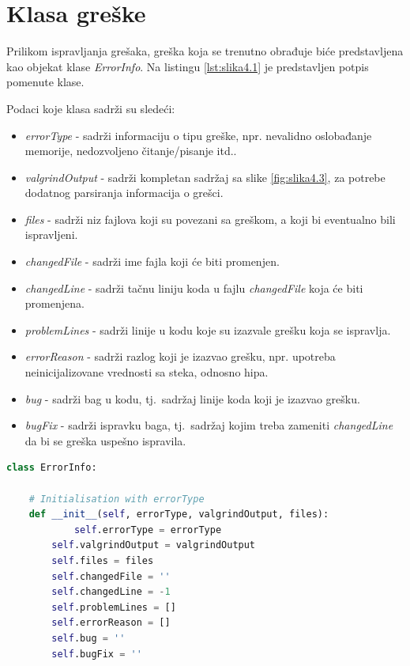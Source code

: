 \documentclass[12pt,oneside]{memoir}
\theoremstyle{plain}
\theoremstyle{definition}
\begin{document}
\section{Klasa greške}
Prilikom ispravljanja grešaka, greška koja se trenutno obrađuje biće predstavljena kao objekat klase \textit{ErrorInfo}. Na listingu \ref{lst:slika4.1} je predstavljen potpis pomenute klase.

Podaci koje klasa sadrži su sledeći:
\begin{itemize}
\item \textit{errorType} - sadrži informaciju o tipu greške, npr. nevalidno oslobađanje memorije, nedozvoljeno čitanje/pisanje itd..
\item \textit{valgrindOutput} - sadrži kompletan sadržaj sa slike \ref{fig:slika4.3}, za potrebe dodatnog parsiranja informacija o grešci.
\item \textit{files} - sadrži niz fajlova koji su povezani sa greškom, a koji bi eventualno bili ispravljeni.
\item \textit{changedFile} - sadrži ime fajla koji će biti promenjen.
\item \textit{changedLine} - sadrži tačnu liniju koda u fajlu \textit{changedFile} koja će biti promenjena.
\item \textit{problemLines} - sadrži linije u kodu koje su izazvale grešku koja se ispravlja.
\item \textit{errorReason} - sadrži razlog koji je izazvao grešku, npr. upotreba neinicijalizovane vrednosti sa steka, odnosno hipa.
\item \textit{bug} - sadrži bag u kodu, tj.~sadržaj linije koda koji je izazvao grešku.
\item \textit{bugFix} - sadrži ispravku baga, tj.~sadržaj kojim treba zameniti \textit{changedLine} da bi se greška uspešno ispravila.
\end{itemize}

\begin{lstlisting}[caption={Potpis klase \textit{ErrorInfo}}, label={lst:slika4.1},language={Python}] 
class ErrorInfo:

	# Initialisation with errorType
	def __init__(self, errorType, valgrindOutput, files):
        	self.errorType = errorType
		self.valgrindOutput = valgrindOutput
		self.files = files
		self.changedFile = ''
		self.changedLine = -1
		self.problemLines = []
		self.errorReason = []
		self.bug = ''
		self.bugFix = ''
\end{lstlisting}
\end{document}
